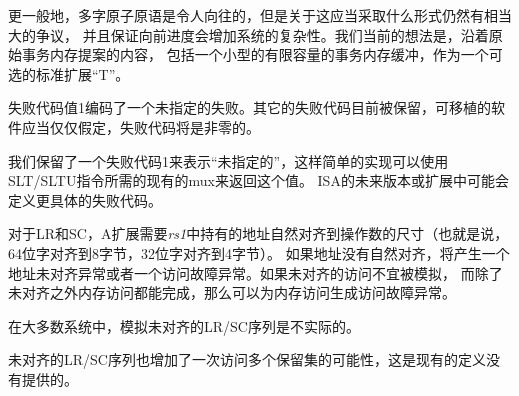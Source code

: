 \begin{commentary}
更一般地，多字原子原语是令人向往的，但是关于这应当采取什么形式仍然有相当大的争议，
并且保证向前进度会增加系统的复杂性。我们当前的想法是，沿着原始事务内存提案的内容，
包括一个小型的有限容量的事务内存缓冲，作为一个可选的标准扩展“T”。
\end{commentary}

失败代码值1编码了一个未指定的失败。其它的失败代码目前被保留，可移植的软件应当仅仅假定，失败代码将是非零的。

\begin{commentary}
  我们保留了一个失败代码1来表示“未指定的”，这样简单的实现可以使用SLT/SLTU指令所需的现有的mux来返回这个值。
  ISA的未来版本或扩展中可能会定义更具体的失败代码。
\end{commentary}

对于LR和SC，A扩展需要{\em rs1}中持有的地址自然对齐到操作数的尺寸（也就是说，64位字对齐到8字节，32位字对齐到4字节）。
如果地址没有自然对齐，将产生一个地址未对齐异常或者一个访问故障异常。如果未对齐的访问不宜被模拟，
而除了未对齐之外内存访问都能完成，那么可以为内存访问生成访问故障异常。

\begin{commentary}
  在大多数系统中，模拟未对齐的LR/SC序列是不实际的。

  未对齐的LR/SC序列也增加了一次访问多个保留集的可能性，这是现有的定义没有提供的。
\end{commentary}

